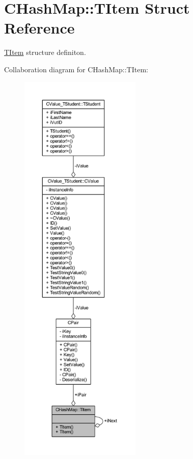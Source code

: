 \hypertarget{struct_c_hash_map_1_1_t_item}{}\section{C\+Hash\+Map\+:\+:T\+Item Struct Reference}
\label{struct_c_hash_map_1_1_t_item}


\hyperlink{struct_c_hash_map_1_1_t_item}{T\+Item} structure definiton.  




Collaboration diagram for C\+Hash\+Map\+:\+:T\+Item\+:
\nopagebreak
\begin{figure}[H]
\begin{center}
\leavevmode
\includegraphics[height=550pt]{struct_c_hash_map_1_1_t_item__coll__graph}
\end{center}
\end{figure}
